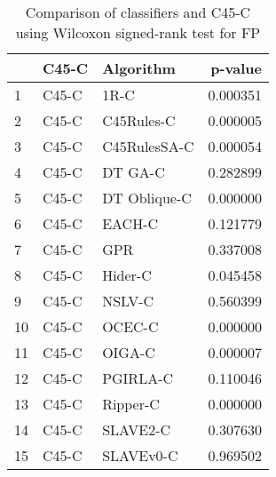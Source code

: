 \begin{table}
\footnotesize
\caption{Comparison of classifiers and C45-C using Wilcoxon signed-rank test for FP}
\label{tab:C45-C wilcoxon FP comparison}
\begin{tabular}{lllr}
\hline
 & C45-C & Algorithm & p-value \\
\hline
1 & C45-C & 1R-C & 0.000351 \\
2 & C45-C & C45Rules-C & 0.000005 \\
3 & C45-C & C45RulesSA-C & 0.000054 \\
4 & C45-C & DT GA-C & 0.282899 \\
5 & C45-C & DT Oblique-C & 0.000000 \\
6 & C45-C & EACH-C & 0.121779 \\
7 & C45-C & GPR & 0.337008 \\
8 & C45-C & Hider-C & 0.045458 \\
9 & C45-C & NSLV-C & 0.560399 \\
10 & C45-C & OCEC-C & 0.000000 \\
11 & C45-C & OIGA-C & 0.000007 \\
12 & C45-C & PGIRLA-C & 0.110046 \\
13 & C45-C & Ripper-C & 0.000000 \\
14 & C45-C & SLAVE2-C & 0.307630 \\
15 & C45-C & SLAVEv0-C & 0.969502 \\
\hline
\end{tabular}
\end{table}
